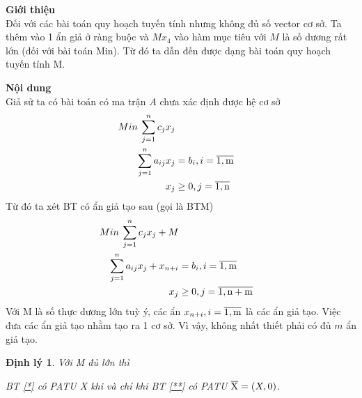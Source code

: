 \documentclass{article}
\newtheorem{dl}{Định lý}
\begin{document}
                \begin{enumerate}
                    \item \textbf{Giới thiệu} \\
                        Đối với các bài toán quy hoạch tuyến tính nhưng không đủ số vector cơ sở. Ta thêm vào 1 ẩn giả ở ràng buộc và $Mx_4$ vào hàm mục tiêu với $M$ là số dương rất lớn (đối với bài toán Min). Từ đó ta dẫn đến được dạng bài toán quy hoạch tuyến tính M.
                    \item \textbf{Nội dung} \\
                        Giả sử ta có bài toán có ma trận $A$ chưa xác định được hệ cơ sở
                            \begin{equation} \label{*}
                                \begin{split}
                                    Min \: \sum_{j=1}^n c_jx_j \\
                                    \sum_{j=1}^n a_{ij}x_j&=b_i , i = \overline{\rm 1,m} \\
                                    x_j &\geq 0 , j = \overline{\rm 1,n} \\
                                \end{split}
                            \end{equation}
                        Từ đó ta xét BT có ẩn giả tạo sau (gọi là BTM)
                            \begin{equation} \label{**}
                                \begin{split}
                                    Min \: \sum_{j=1}^n c_jx_j+M \\
                                    \sum_{j=1}^n a_{ij}x_j + x_{n+i}&=b_i , i = \overline{\rm 1,m} \\
                                    x_j &\geq 0 , j= \overline{\rm 1,{n+m}}
                                \end{split}
                            \end{equation}
                        Với M là số thực dương lớn tuỳ ý, các ẩn $x_{n+i} , i=\overline{\rm 1,m}$ là các ẩn giả tạo. Việc đưa các ẩn giả tạo nhằm tạo ra 1 cơ sở. Vì vậy, không nhất thiết phải có đủ $m$ ẩn giả tạo.
                            \begin{dl}
                                Với M đủ lớn thì
                                \item BT \eqref{*}  có PATU X khi và chỉ khi BT \eqref{**} có PATU $\overline{\rm X} = (X,0)$.

\end{dl}
\end{enumerate}
\end{document}
